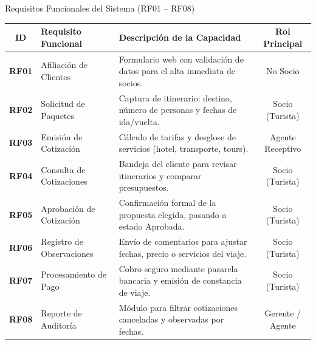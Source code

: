 \documentclass[aspectratio=169, 10pt]{beamer}
\begin{document}
\begin{frame}{Requisitos Funcionales del Sistema (RF01 -- RF08)}
    \scriptsize
    \begin{table}[H]
    \centering
    \renewcommand{\arraystretch}{1.15}
    \begin{tabularx}{\textwidth}{clLc}
    \hline
    \textbf{ID} & \textbf{Requisito Funcional} & \textbf{Descripción de la Capacidad} & \textbf{Rol Principal} \\ \hline
    \textbf{RF01} & Afiliación de Clientes & Formulario web con validación de datos para el alta inmediata de socios. & No Socio \\ \hline
    \textbf{RF02} & Solicitud de Paquetes & Captura de itinerario: destino, número de personas y fechas de ida/vuelta. & Socio (Turista) \\ \hline
    \textbf{RF03} & Emisión de Cotización & Cálculo de tarifas y desglose de servicios (hotel, transporte, tours). & Agente Receptivo \\ \hline
    \textbf{RF04} & Consulta de Cotizaciones & Bandeja del cliente para revisar itinerarios y comparar presupuestos. & Socio (Turista) \\ \hline
    \textbf{RF05} & Aprobación de Cotización & Confirmación formal de la propuesta elegida, pasando a estado Aprobada. & Socio (Turista) \\ \hline
    \textbf{RF06} & Registro de Observaciones & Envío de comentarios para ajustar fechas, precio o servicios del viaje. & Socio (Turista) \\ \hline
    \textbf{RF07} & Procesamiento de Pago & Cobro seguro mediante pasarela bancaria y emisión de constancia de viaje. & Socio (Turista) \\ \hline
    \textbf{RF08} & Reporte de Auditoría & Módulo para filtrar cotizaciones canceladas y observadas por fechas. & Gerente / Agente \\ \hline
    \end{tabularx}
    \end{table}
\end{frame}
\end{document}
